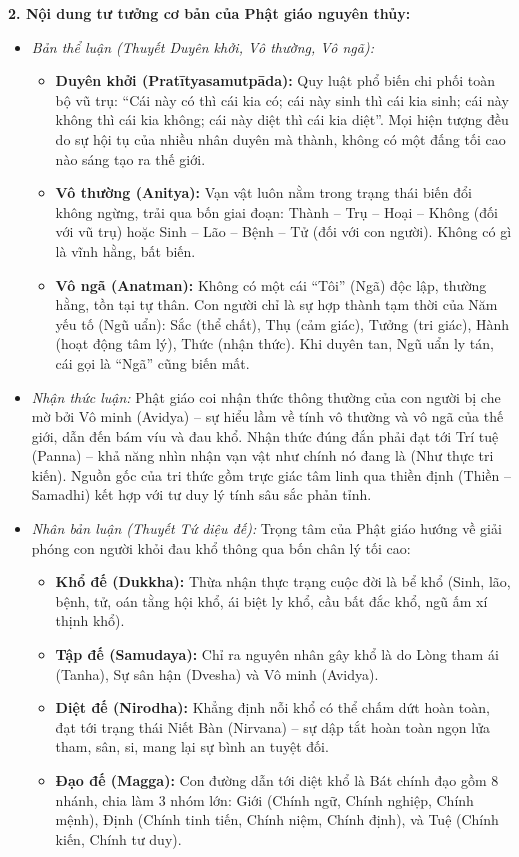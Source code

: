 \documentclass[12pt,a4paper]{article}
\begin{document}
\noindent
\textbf{2. Nội dung tư tưởng cơ bản của Phật giáo nguyên thủy:}
\begin{itemize}
    \item \textit{Bản thể luận (Thuyết Duyên khởi, Vô thường, Vô ngã):}
    \begin{itemize}
        \item \textbf{Duyên khởi (Pratītyasamutpāda):} Quy luật phổ biến chi phối toàn bộ vũ trụ: ``Cái này có thì cái kia có; cái này sinh thì cái kia sinh; cái này không thì cái kia không; cái này diệt thì cái kia diệt''. Mọi hiện tượng đều do sự hội tụ của nhiều nhân duyên mà thành, không có một đấng tối cao nào sáng tạo ra thế giới.
        \item \textbf{Vô thường (Anitya):} Vạn vật luôn nằm trong trạng thái biến đổi không ngừng, trải qua bốn giai đoạn: Thành -- Trụ -- Hoại -- Không (đối với vũ trụ) hoặc Sinh -- Lão -- Bệnh -- Tử (đối với con người). Không có gì là vĩnh hằng, bất biến.
        \item \textbf{Vô ngã (Anatman):} Không có một cái ``Tôi'' (Ngã) độc lập, thường hằng, tồn tại tự thân. Con người chỉ là sự hợp thành tạm thời của Năm yếu tố (Ngũ uẩn): Sắc (thể chất), Thụ (cảm giác), Tưởng (tri giác), Hành (hoạt động tâm lý), Thức (nhận thức). Khi duyên tan, Ngũ uẩn ly tán, cái gọi là ``Ngã'' cũng biến mất.
    \end{itemize}
    \item \textit{Nhận thức luận:} Phật giáo coi nhận thức thông thường của con người bị che mờ bởi Vô minh (Avidya) -- sự hiểu lầm về tính vô thường và vô ngã của thế giới, dẫn đến bám víu và đau khổ. Nhận thức đúng đắn phải đạt tới Trí tuệ (Panna) -- khả năng nhìn nhận vạn vật như chính nó đang là (Như thực tri kiến). Nguồn gốc của tri thức gồm trực giác tâm linh qua thiền định (Thiền -- Samadhi) kết hợp với tư duy lý tính sâu sắc phản tỉnh.
    \item \textit{Nhân bản luận (Thuyết Tứ diệu đế):} Trọng tâm của Phật giáo hướng về giải phóng con người khỏi đau khổ thông qua bốn chân lý tối cao:
    \begin{itemize}
        \item \textbf{Khổ đế (Dukkha):} Thừa nhận thực trạng cuộc đời là bể khổ (Sinh, lão, bệnh, tử, oán tằng hội khổ, ái biệt ly khổ, cầu bất đắc khổ, ngũ ấm xí thịnh khổ).
        \item \textbf{Tập đế (Samudaya):} Chỉ ra nguyên nhân gây khổ là do Lòng tham ái (Tanha), Sự sân hận (Dvesha) và Vô minh (Avidya).
        \item \textbf{Diệt đế (Nirodha):} Khẳng định nỗi khổ có thể chấm dứt hoàn toàn, đạt tới trạng thái Niết Bàn (Nirvana) -- sự dập tắt hoàn toàn ngọn lửa tham, sân, si, mang lại sự bình an tuyệt đối.
        \item \textbf{Đạo đế (Magga):} Con đường dẫn tới diệt khổ là Bát chính đạo gồm 8 nhánh, chia làm 3 nhóm lớn: Giới (Chính ngữ, Chính nghiệp, Chính mệnh), Định (Chính tinh tiến, Chính niệm, Chính định), và Tuệ (Chính kiến, Chính tư duy).
    \end{itemize}
\end{itemize}
\end{document}
